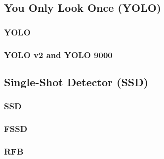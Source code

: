 \subsection*{You Only Look Once (YOLO)}
\subsubsection{YOLO}
\label{sec:yolo}
\subsubsection{YOLO v2 and YOLO 9000}

\subsection*{Single-Shot Detector (SSD)}
\label{sec:ssd}
\subsubsection{SSD}
\subsubsection{FSSD}
\subsubsection{RFB}




